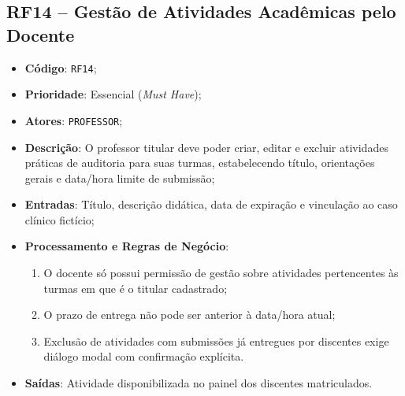 \subsection{RF14 -- Gestão de Atividades Acadêmicas pelo Docente}
\begin{itemize}
    \item \textbf{Código}: \texttt{RF14};
    \item \textbf{Prioridade}: Essencial (\textit{Must Have});
    \item \textbf{Atores}: \texttt{PROFESSOR};
    \item \textbf{Descrição}: O professor titular deve poder criar, editar e excluir atividades práticas de auditoria para suas turmas, estabelecendo título, orientações gerais e data/hora limite de submissão;
    \item \textbf{Entradas}: Título, descrição didática, data de expiração e vinculação ao caso clínico fictício;
    \item \textbf{Processamento e Regras de Negócio}:
    \begin{enumerate}
        \item O docente só possui permissão de gestão sobre atividades pertencentes às turmas em que é o titular cadastrado;
        \item O prazo de entrega não pode ser anterior à data/hora atual;
        \item Exclusão de atividades com submissões já entregues por discentes exige diálogo modal com confirmação explícita.
    \end{enumerate}
    \item \textbf{Saídas}: Atividade disponibilizada no painel dos discentes matriculados.
\end{itemize}

